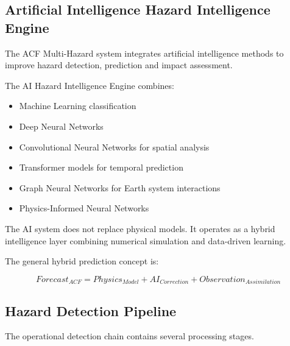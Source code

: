 \subsection{Artificial Intelligence Hazard Intelligence Engine}

The ACF Multi-Hazard system integrates artificial intelligence methods
to improve hazard detection, prediction and impact assessment.

The AI Hazard Intelligence Engine combines:

\begin{itemize}

\item Machine Learning classification

\item Deep Neural Networks

\item Convolutional Neural Networks for spatial analysis

\item Transformer models for temporal prediction

\item Graph Neural Networks for Earth system interactions

\item Physics-Informed Neural Networks

\end{itemize}

The AI system does not replace physical models. It operates as a hybrid
intelligence layer combining numerical simulation and data-driven
learning.

The general hybrid prediction concept is:

\[
Forecast_{ACF}
=
Physics_{Model}
+
AI_{Correction}
+
Observation_{Assimilation}
\]


\subsection{Hazard Detection Pipeline}

The operational detection chain contains several processing stages.


